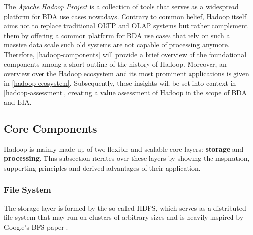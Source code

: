 The \emph{Apache Hadoop Project} is a collection of tools that serves as a widespread platform for \ac{BDA} use cases nowadays. Contrary to common belief, Hadoop itself aims not to replace traditional \ac{OLTP} and \ac{OLAP} systems but rather complement them by offering a common platform for \ac{BDA} use cases that rely on such a massive data scale such old systems are not capable of processing anymore. Therefore, \autoref{hadoop-components} will provide a brief overview of the foundational components among a short outline of the history of Hadoop. Moreover, an overview over the Hadoop ecosystem and its most prominent applications is given in \autoref{hadoop-ecosystem}.
Subsequently, these insights will be set into context in \autoref{hadoop-assessment}, creating a value assessment of Hadoop in the scope of \ac{BDA} and \ac{BIA}.

\subsection{Core Components}
\label{hadoop-components}

Hadoop is mainly made up of two flexible and scalable core layers: \textbf{storage} and \textbf{processing}. This subsection iterates over these layers by showing the inspiration, supporting principles and derived advantages of their application.

\subsubsection{File System} 
The storage layer is formed by the so-called \acf{HDFS}, which serves as a distributed file system that may run on clusters of arbitrary sizes and is heavily inspired by Google's \ac{BFS} paper \autocite{ghemawat2003gfs}.

